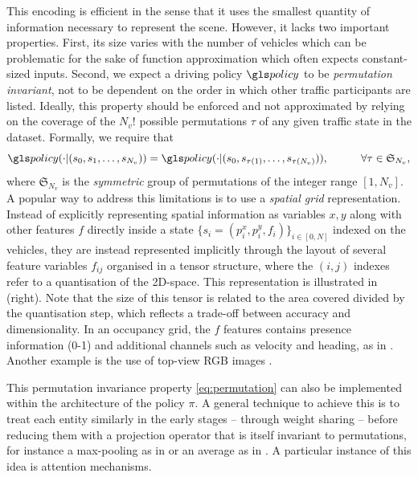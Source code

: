 This encoding is efficient in the sense that it uses the smallest quantity of information necessary to represent the scene. However, it lacks two important properties. First, its size varies with the number of vehicles which can be problematic for the sake of function approximation which often expects constant-sized inputs. Second, we expect a driving policy $\policy$ to be \emph{permutation invariant}, \ie not to be dependent on the order in which other traffic participants are listed. Ideally, this property should be enforced and not approximated by relying on the coverage of the $N_v!$ possible permutations $\tau$ of any given traffic state in the dataset. Formally, we require that
\begin{equation}
\label{eq:permutation}
\policy(\cdot|(s_0, s_1,\dotsc,s_{N_v})) = \policy(\cdot|(s_0, s_{\tau(1)},\dotsc,s_{\tau(N_v)})), \quad\quad\quad \forall\tau \in \mathfrak{S}_{N_v},
\end{equation}
where $\mathfrak{S}_{N_v}$ is the \emph{symmetric} group of permutations of the integer range $[1,N_v]$.
A popular way to address this limitations is to use a \emph{spatial grid} representation. Instead of explicitly representing spatial information as variables $x, y$ along with other features $f$ directly inside a state $\{s_i=(p^x_i,p^y_i,f_i)\}_{i\in[0,N]}$ indexed on the vehicles, they are instead represented implicitly through the layout of several feature variables $f_{ij}$ organised in a tensor structure, where the $(i,j)$ indexes refer to a quantisation of the 2D-space. This representation is illustrated in  (right). Note that the size of this tensor is related to the area covered divided by the quantisation step, which reflects a trade-off between accuracy and dimensionality.
In an occupancy grid, the $f$ features contains presence information (0-1) and additional channels such as velocity and heading, as in \citep[\eg][]{Isele2018, Fridman2018, Bansal2018, Rehder2017c}. Another example is the use of top-view RGB images \citep[\eg][]{Bagnell2010, Rehder2017, Rehder2017c, Liu2018}.


This permutation invariance property \eqref{eq:permutation} can also be implemented within the architecture of the policy $\pi$. A general technique to achieve this is to treat each entity similarly in the early stages -- \eg through weight sharing -- before reducing them with a projection operator that is itself invariant to permutations, for instance a max-pooling as in \citep{Chen2017,Hoel2018} or an average as in \citep{Qi2016}. A particular instance of this idea is attention mechanisms.


